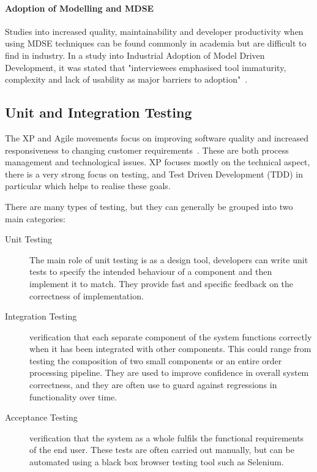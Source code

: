 \documentclass{cshonours}
\begin{document}
\paragraph{Adoption of Modelling and MDSE}

Studies into increased quality, maintainability and developer productivity when using MDSE techniques can be found commonly in academia but are difficult to find in industry. In a study into Industrial Adoption of Model Driven Development, it was stated that "interviewees emphasised tool immaturity, complexity and lack of usability as major barriers to adoption"~\cite{IndustryMDSE}.

\pagebreak
\subsection{Unit and Integration Testing}

The XP and Agile movements focus on improving software quality and increased responsiveness to changing customer requirements~\cite{WikiXP}. These are both process management and technological issues. XP focuses mostly on the technical aspect, there is a very strong focus on testing, and Test Driven Development (TDD) in particular which helps to realise these goals.

There are many types of testing, but they can generally be grouped into two main categories:

\begin{description}
  \item[Unit Testing] The main role of unit testing is as a design tool, developers can write unit tests to specify the intended behaviour of a component and then implement it to match. They provide fast and specific feedback on the correctness of implementation.
  \item[Integration Testing] verification that each separate component of the system functions correctly when it has been integrated with other components. This could range from testing the composition of two small components or an entire order processing pipeline. They are used to improve confidence in overall system correctness, and they are often use to guard against regressions in functionality over time.
  \item[Acceptance Testing] verification that the system as a whole fulfils the functional requirements of the end user. These tests are often carried out manually, but can be automated using a black box browser testing tool such as Selenium.
\end{description}
\end{document}
